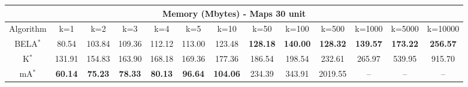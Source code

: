 \begin{tabular}{c|cccccccccccc}\toprule
\multicolumn{13}{c}{Memory (Mbytes) - Maps 30 unit}\\ \midrule
Algorithm & k=1 & k=2 & k=3 & k=4 & k=5 & k=10 & k=50 & k=100 & k=500 & k=1000 & k=5000 & k=10000 \\ \midrule
BELA$^*$ & 80.54 & 103.84 & 109.36 & 112.12 & 113.00 & 123.48 & \textbf{128.18} & \textbf{140.00} & \textbf{128.32} & \textbf{139.57} & \textbf{173.22} & \textbf{256.57} \\
K$^*$ & 131.91 & 154.83 & 163.90 & 168.18 & 169.36 & 177.36 & 186.54 & 198.54 & 232.61 & 265.97 & 539.95 & 915.70 \\
mA$^*$ & \textbf{60.14} & \textbf{75.23} & \textbf{78.33} & \textbf{80.13} & \textbf{96.64} & \textbf{104.06} & 234.39 & 343.91 & 2019.55 & -- & -- & -- \\ \bottomrule 
\end{tabular}
